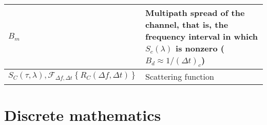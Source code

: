 \documentclass{article}
\begin{document}
\begin{xltabular}{\textwidth}{XX}
	\(B_m\)                                                                                                                                                 & Multipath spread of the channel, that is, the frequency interval in which \(S_c(\lambda)\) is nonzero (\(B_d \approx 1/(\Delta t)_c \))                             \\ \hline
	\(S_C(\tau, \lambda), \mathcal{F}_{\Delta f, \Delta t}\left\{ R_C (\Delta f, \Delta t) \right\}\)                                                       & Scattering function                                                                                                                                                 \\ \hline
\end{xltabular}

\section{Discrete mathematics}
\end{document}

